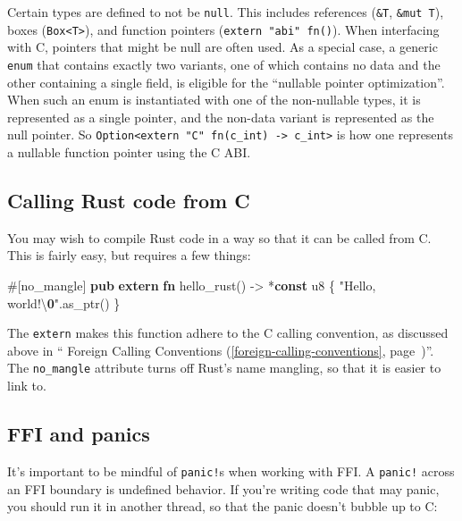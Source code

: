 \documentclass[a4paper,]{book}
\renewcommand*{\hyperref}[2][\ar]{%
  \def\ar{#2}%
  #2 (\autoref{#1}, page~\pageref{#1})}
\newenvironment{Shaded}{\begin{snugshade}}{\end{snugshade}}
\newcommand{\KeywordTok}[1]{\textcolor[rgb]{0.13,0.29,0.53}{\textbf{{#1}}}}
\newcommand{\DataTypeTok}[1]{\textcolor[rgb]{0.13,0.29,0.53}{{#1}}}
\newcommand{\SpecialCharTok}[1]{\textcolor[rgb]{0.00,0.00,0.00}{{#1}}}
\newcommand{\StringTok}[1]{\textcolor[rgb]{0.31,0.60,0.02}{{#1}}}
\newcommand{\AttributeTok}[1]{\textcolor[rgb]{0.77,0.63,0.00}{{#1}}}
\newcommand{\ErrorTok}[1]{\textcolor[rgb]{0.64,0.00,0.00}{\textbf{{#1}}}}
\newcommand{\NormalTok}[1]{{#1}}
\begin{document}
Certain types are defined to not be \texttt{null}. This includes
references (\texttt{\&T}, \texttt{\&mut\ T}), boxes
(\texttt{Box\textless{}T\textgreater{}}), and function pointers
(\texttt{extern\ "abi"\ fn()}). When interfacing with C, pointers that
might be null are often used. As a special case, a generic \texttt{enum}
that contains exactly two variants, one of which contains no data and
the other containing a single field, is eligible for the ``nullable
pointer optimization''. When such an enum is instantiated with one of
the non-nullable types, it is represented as a single pointer, and the
non-data variant is represented as the null pointer. So
\texttt{Option\textless{}extern\ "C"\ fn(c\_int)\ -\textgreater{}\ c\_int\textgreater{}}
is how one represents a nullable function pointer using the C ABI.

\subsection{Calling Rust code from C}\label{calling-rust-code-from-c}

You may wish to compile Rust code in a way so that it can be called from
C. This is fairly easy, but requires a few things:

\begin{Shaded}
\begin{Highlighting}[]
\AttributeTok{#[}\NormalTok{no_mangle}\AttributeTok{]}
\KeywordTok{pub} \KeywordTok{extern} \KeywordTok{fn} \NormalTok{hello_rust() -> *}\KeywordTok{const} \DataTypeTok{u8} \NormalTok{\{}
    \StringTok{"Hello, world!}\SpecialCharTok{\textbackslash{}}\ErrorTok{0}\StringTok{"}\NormalTok{.as_ptr()}
\NormalTok{\}}
\end{Highlighting}
\end{Shaded}

The \texttt{extern} makes this function adhere to the C calling
convention, as discussed above in
``\hyperref[foreign-calling-conventions]{Foreign Calling Conventions}''.
The \texttt{no\_mangle} attribute turns off Rust's name mangling, so
that it is easier to link to.

\subsection{FFI and panics}\label{ffi-and-panics}

It's important to be mindful of \texttt{panic!}s when working with FFI.
A \texttt{panic!} across an FFI boundary is undefined behavior. If
you're writing code that may panic, you should run it in another thread,
so that the panic doesn't bubble up to C:
\end{document}
